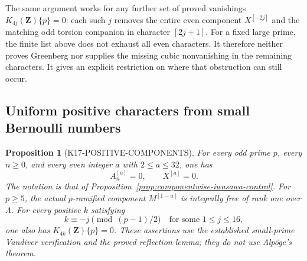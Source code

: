 \documentclass[11pt,a4paper]{article}
\newtheorem{proposition}[theorem]{Proposition}
\theoremstyle{definition}
\begin{document}
The same argument works for any further set of proved vanishings
$K_{4j}(\mathbf Z)\{p\}=0$: each such $j$ removes the entire
even component $X^{[-2j]}$ and the matching odd torsion companion
in character $[2j+1]$. For a fixed large prime, the finite list
above does not exhaust all even characters. It therefore neither
proves Greenberg nor supplies the missing cubic nonvanishing in
the remaining characters. It gives an explicit restriction on
where that obstruction can still occur.

\subsection{Uniform positive characters from small Bernoulli numbers}
\label{sec:positive-iwasawa-components}

\begin{proposition}[K17-POSITIVE-COMPONENTS]
\label{prop:positive-iwasawa-components}
For every odd prime $p$, every $n\geq0$, and every even integer
$a$ with $2\leq a\leq32$, one has
\[
                      A_n^{[a]}=0,
                      \qquad X^{[a]}=0.
 \tag{PC.1}
\]
The notation is that of Proposition~\ref{prop:componentwise-iwasawa-control}.
For $p\geq5$, the actual $p$-ramified component $M^{[1-a]}$
is integrally free of rank one over $\Lambda$.
For every positive $k$ satisfying
\[
       k\equiv-j\pmod{(p-1)/2}
                  \quad\text{for some }1\leq j\leq16,
\]
one also has $K_{4k}(\mathbf Z)\{p\}=0$.
These assertions use the established small-prime Vandiver verification
and the proved reflection lemma; they do not use Alp\"oge's theorem.
\end{proposition}
\end{document}
